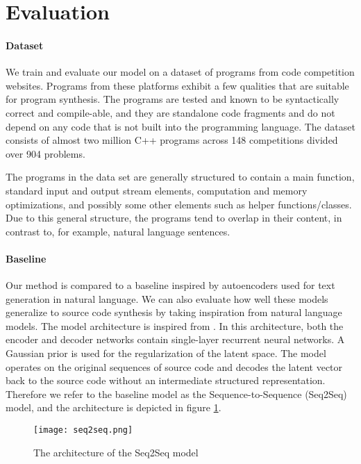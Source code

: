 \newpage
\section{Evaluation}
\label{sec:tree2tree-eval}

\paragraph{Dataset}
We train and evaluate our model on a dataset of programs from code competition websites. Programs from these platforms exhibit a few qualities that are suitable for program synthesis. The programs are tested and known to be syntactically correct and compile-able, and they are standalone code fragments and do not depend on any code that is not built into the programming language. The dataset consists of almost two million C++ programs across 148 competitions divided over 904 problems. 

The programs in the data set are generally structured to contain a main function, standard input and output stream elements, computation and memory optimizations, and possibly some other elements such as helper functions/classes. Due to this general structure, the programs tend to overlap in their content, in contrast to, for example, natural language sentences. 

\paragraph{Baseline}
Our method is compared to a baseline inspired by autoencoders used for text generation in natural language. We can also evaluate how well these models generalize to source code synthesis by taking inspiration from natural language models. The model architecture is inspired from \cite{bowman2015generating}. In this architecture, both the encoder and decoder networks contain single-layer recurrent neural networks. A Gaussian prior is used for the regularization of the latent space. The model operates on the original sequences of source code and decodes the latent vector back to the source code without an intermediate structured representation. Therefore we refer to the baseline model as the Sequence-to-Sequence (Seq2Seq) model, and the architecture is depicted in figure \ref{fig:seq2seq}.

\begin{figure}[ht!]
    \centering
    \texttt{[image: seq2seq.png]}
    \caption{The architecture of the Seq2Seq model}
    \label{fig:seq2seq}
\end{figure}

